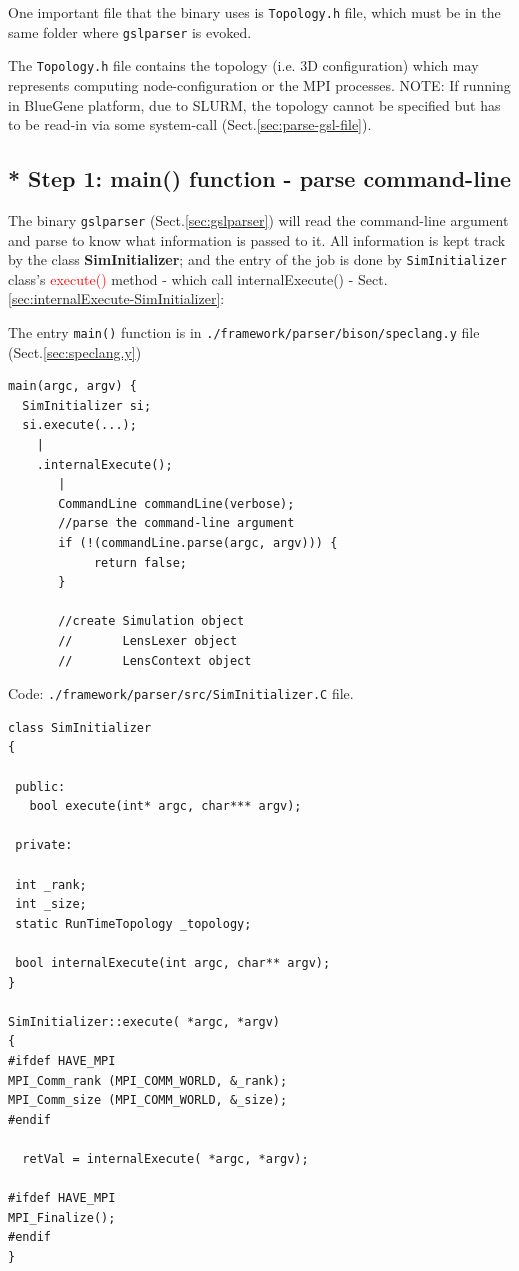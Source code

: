 One important file that the binary uses is \verb!Topology.h! file, which must be
in the same folder where \verb!gslparser! is evoked.

The \verb!Topology.h! file contains the topology (i.e. 3D configuration) which
may represents computing node-configuration or the MPI processes. NOTE: If
running in BlueGene platform, due to SLURM, the topology cannot be specified but
has to be read-in via some system-call (Sect.\ref{sec:parse-gsl-file}).


\subsection{* Step 1: main() function - parse command-line}
\label{sec:parser-Parser}
\label{sec:SimInitializer}

The binary \verb!gslparser! (Sect.\ref{sec:gslparser}) will read the
command-line argument and parse to know what information is passed to it.
All information is kept track by the class {\bf SimInitializer}; and the entry
of the job is done by \verb!SimInitializer! class's \textcolor{red}{execute()}
method - which call internalExecute() -
Sect.\ref{sec:internalExecute-SimInitializer}:

The entry \verb!main()! function is in
\verb!./framework/parser/bison/speclang.y! file (Sect.\ref{sec:speclang.y})

{\tiny
\begin{verbatim}
main(argc, argv) {
  SimInitializer si;
  si.execute(...);
    |
    .internalExecute();
       |
       CommandLine commandLine(verbose);
       //parse the command-line argument
       if (!(commandLine.parse(argc, argv))) {                                                         
            return false;                                                                                
       }
       
       //create Simulation object
       //       LensLexer object
       //       LensContext object
\end{verbatim}
}


Code: \verb!./framework/parser/src/SimInitializer.C! file.
{\tiny
\begin{lstlisting}
class SimInitializer
{

 public:
   bool execute(int* argc, char*** argv);
   
 private:  
 
 int _rank; 
 int _size;
 static RunTimeTopology _topology;
 
 bool internalExecute(int argc, char** argv);
}

SimInitializer::execute( *argc, *argv)
{
#ifdef HAVE_MPI
MPI_Comm_rank (MPI_COMM_WORLD, &_rank);
MPI_Comm_size (MPI_COMM_WORLD, &_size);
#endif
  
  retVal = internalExecute( *argc, *argv);
  
#ifdef HAVE_MPI
MPI_Finalize();
#endif
}
\end{lstlisting}
}


